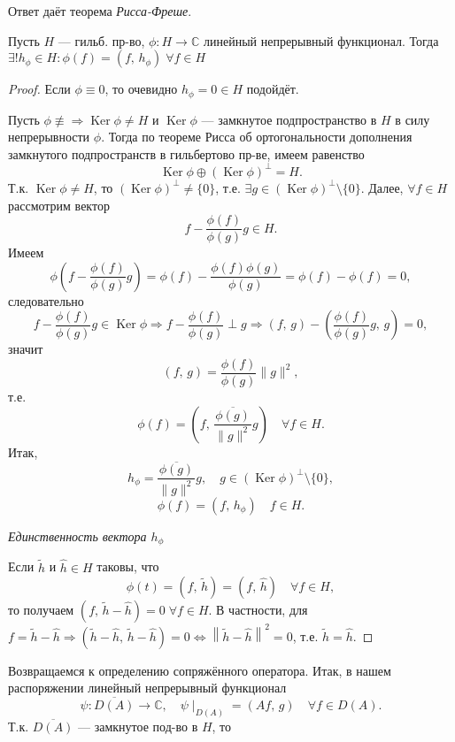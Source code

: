 \documentclass[a4paper]{article}
\begin{document}
Ответ даёт теорема \emph{Рисса-Фреше}.
\begin{thm}
Пусть $H$ --- гильб.
пр-во, $\phi : H \to \mathbb{C}$ линейный непрерывный
функционал. Тогда $\exists! h_\phi \in H: \phi(f) =(f,\,h_\phi)
 \; \forall f \in H$
\end{thm}
\begin{proof}
	Если $\phi \equiv 0$, то очевидно $h_\phi=0 \in H$ 
	подойдёт.

	Пусть $\phi \not\equiv \Rightarrow \operatorname{Ker}
	\phi \neq H$ и $\operatorname{Ker} \phi$ --- замкнутое
	подпространство в $H$ в силу непрерывности $\phi$.
	Тогда по теореме Рисса об ортогональности дополнения
	замкнутого подпространств в гильбертово пр-ве,
	имеем равенство
	\[
		\operatorname{Ker}\phi \oplus (\operatorname{Ker}\phi)^\perp = H
	.\]
	Т.\:к. $\operatorname{Ker}\phi \neq H$, то 
	$\left( \operatorname{Ker}\phi \right) ^\perp \neq
	\{0\} $, т.\:е. $\exists g \in \left( \operatorname{Ker}\phi \right)^\perp \setminus \{0\}  $.
	Далее, $\forall f \in  H$ рассмотрим вектор
	\[
		f - \frac{\phi(f)}{\phi(g)}g \in H
	.\] 
	Имеем 
	\[
		\phi\left(f - \frac{\phi(f)}{\phi(g)}g\right)=
		\phi(f)- \frac{\phi(f) \phi(g)}{\phi(g)}=
		\phi(f) - \phi(f)=0
	,\]
	следовательно
	\[
		f - \frac{\phi(f)}{\phi(g)}g \in \operatorname{Ker}
		\phi \Rightarrow f - \frac{\phi(f)}{\phi(g)}\perp g
		\Rightarrow (f,\,g) - \left( 
		\frac{\phi(f)}{\phi(g)}g,\,g\right) =0,
	\]
	значит
	\[
		(f,\,g)= \frac{\phi(f)}{\phi(g)}\| g\|^2,
	\]
	т.\:е.
	\[
		\phi(f) = \left( f,\, \frac{\overline{\phi(g)}}{
		\|g \|^2}g \right) \quad \forall f \in H
	.\] 
	Итак,
	\[
		h_\phi= \frac{\overline{\phi(g)}}{\| g\|^2}g,
		\quad g \in \left( \operatorname{Ker}\phi \right) ^\perp \setminus \{0\} 
	,\]
	\[
		\phi(f) = (f,\, h_\phi) \quad f \in H
	.\]

	\emph{Единственность вектора $h_\phi$}
	
	Если $ \tilde{h}$ и $ \hat{h}\in H$ таковы, что
	\[
		\phi(t) =\left(f,\,\tilde{h}\right)=
		\left( f,\, \hat{h} \right) \quad \forall
		f \in H
	,\]
	то        получаем $    \left(f,\,\tilde{h}-\hat{h}\right)=0
	\;          \forall f \in H $. В       частности,
	для $f = \tilde{h}- \hat{h} \Rightarrow 
	 \left( \tilde{h}-\hat{h},\,\tilde{h}-
	 \hat{h}\right)=0 \Leftrightarrow \left\lVert 
  \tilde{h}- \hat{h}\right\rVert^2=0$, т.\:е.  $\tilde{h}=\hat{h}$.
\end{proof}
Возвращаемся к определению сопряжённого оператора.
Итак, в нашем распоряжении линейный непрерывный функционал
\[
	\psi: \overline{D(A)}\to \mathbb{C},
	\quad \psi\mid _{D(A)}= (Af,\,g) \quad \forall
	f \in D(A)
.\] Т.\:к. $\overline{D(A)}$ --- замкнутое под-во в $H$, то
\end{document}
